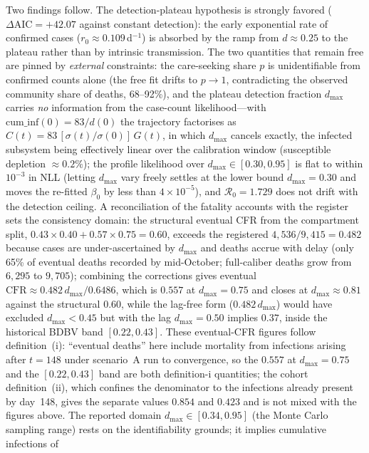 \documentclass[preprint,12pt,numbers]{elsarticle}
\newcommand{\Reff}{\mathcal{R}}
\begin{document}
Two findings follow. The detection-plateau hypothesis is strongly
favored ($\Delta\mathrm{AIC}=+42.07$ against constant detection): the
early exponential rate of confirmed cases ($r_0\approx0.109\,$d$^{-1}$)
is absorbed by the ramp from $d\approx0.25$ to the plateau rather than
by intrinsic transmission. The two quantities that remain free are
pinned by \emph{external} constraints: the care-seeking share $p$ is
unidentifiable from confirmed counts alone (the free fit drifts to
$p\to1$, contradicting the observed community share of deaths,
68--92\%), and the plateau detection fraction $d_{\max}$ carries
\emph{no} information from the case-count likelihood---with
$\mathrm{cum\_inf}(0)=83/d(0)$ the trajectory factorises as
$C(t)=83\,[\sigma(t)/\sigma(0)]\,G(t)$, in which $d_{\max}$ cancels
exactly, the infected subsystem being effectively linear over the
calibration window (susceptible depletion $\approx0.2\%$); the profile
likelihood over $d_{\max}\in[0.30,0.95]$ is flat to within $10^{-3}$ in
NLL (letting $d_{\max}$ vary freely settles at the lower bound
$d_{\max}=0.30$ and moves the re-fitted $\beta_0$ by less than
$4\times10^{-5}$), and $\Reff_0=1.729$ does not drift with the
detection ceiling. A reconciliation of the fatality accounts with the
register sets the consistency domain: the structural eventual CFR from
the compartment split,
$0.43\times0.40+0.57\times0.75=0.60$, exceeds the registered
$4{,}536/9{,}415=0.482$ because cases are under-ascertained by
$d_{\max}$ and deaths accrue with delay (only 65\% of eventual deaths
recorded by mid-October; full-caliber deaths grow from $6{,}295$ to
$9{,}705$); combining the corrections gives eventual
$\mathrm{CFR}\approx0.482\,d_{\max}/0.6486$, which is $0.557$ at
$d_{\max}=0.75$ and closes at $d_{\max}\approx0.81$ against the
structural $0.60$, while the lag-free form ($0.482\,d_{\max}$) would
have excluded $d_{\max}<0.45$ but with the lag $d_{\max}=0.50$ implies
$0.37$, inside the historical BDBV band $[0.22,0.43]$. These
eventual-CFR figures follow definition~(i): ``eventual deaths'' here
include mortality from infections arising after $t=148$ under scenario~A
run to convergence, so the $0.557$ at $d_{\max}=0.75$ and the
$[0.22,0.43]$ band are both definition-i quantities; the cohort
definition~(ii), which confines the denominator to the infections already
present by day~148, gives the separate values $0.854$ and $0.423$ and is
not mixed with the figures above. The reported
domain $d_{\max}\in[0.34,0.95]$ (the Monte Carlo sampling range) rests
on the identifiability grounds; it implies cumulative infections of
\end{document}
